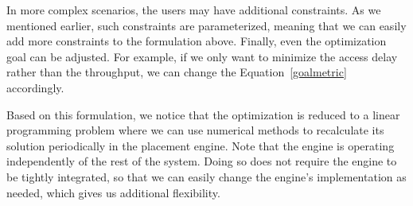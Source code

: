 In more complex scenarios, the users may have additional constraints. As we mentioned earlier, such constraints are parameterized, meaning that we can easily add more constraints to the formulation above. Finally, even the optimization goal can be adjusted. For example, if we only want to minimize the access delay rather than the throughput, we can change the Equation~\ref{goalmetric} accordingly.

Based on this formulation, we notice that the optimization is reduced to a linear programming problem where we can use numerical methods to recalculate its solution periodically in the placement engine. Note that the engine is operating independently of the rest of the system. Doing so does not require the engine to be tightly integrated, so that we can easily change the engine's implementation as needed, which gives us additional flexibility.

